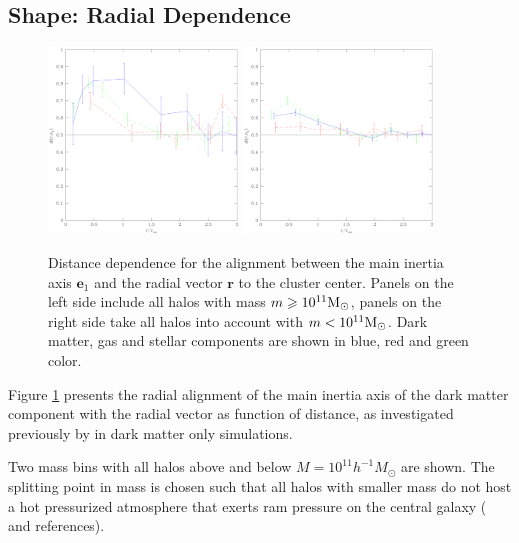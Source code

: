 \documentclass[useAMS,usenatbib]{mn2e}
\begin{document}
\subsection{Shape: Radial Dependence}
%
%
\begin{figure}
  \begin{center}
    \includegraphics[width=0.45\textwidth]{fig/rea/outbig.eps}
    \includegraphics[width=0.45\textwidth]{fig/rea/outsmall.eps}
  \end{center}

  \caption{ \label{fig:rea} Distance dependence for the alignment between the
    main inertia axis $\mathbf{e}_1$ and the radial vector $\mathbf{r}$ to the
    cluster center. Panels on the left side include all halos with mass
    $m\geq10^{11}{\rm M}_\odot$, panels on the right side take all halos into
    account with $m<10^{11}{\rm M}_\odot$. Dark matter, gas and stellar
    components are shown in blue, red and green color.}
\end{figure}
%
%
Figure \ref{fig:rea} presents the radial alignment of the main inertia axis of
the dark matter component with the radial vector as function of distance, as
investigated previously by \cite{Pereira2008} in dark matter only simulations.

Two mass bins with all halos above and below $M=10^{11}h^{-1}M_{\odot}$ are
shown. The splitting point in mass is chosen such that all halos with smaller
mass do not host a hot pressurized atmosphere that exerts ram pressure on the
central galaxy (\cite{Hahn2010} and references).
\end{document}
